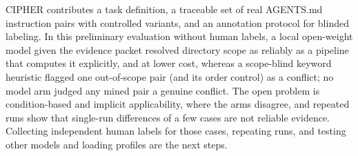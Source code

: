 CIPHER contributes a task definition, a traceable set of real AGENTS.md instruction pairs with controlled variants, and
an annotation protocol for blinded labeling. In this preliminary evaluation without human labels, a local open-weight
model given the evidence packet resolved directory scope as reliably as a pipeline that computes it explicitly, and at
lower cost, whereas a scope-blind keyword heuristic flagged one out-of-scope pair (and its order control) as a conflict;
no model arm judged any mined pair a genuine conflict. The open problem is condition-based and implicit applicability,
where the arms disagree, and repeated runs show that single-run differences of a few cases are not reliable evidence.
Collecting independent human labels for those cases, repeating runs, and testing other models and loading profiles are
the next steps.